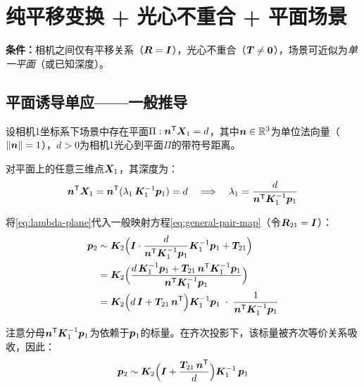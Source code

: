 \section{纯平移变换 + 光心不重合 + 平面场景}
\label{sec:translate-only}

\textbf{条件：}相机之间仅有平移关系（$\bm{R} = \bm{I}$），光心不重合（$\bm{T} \neq \bm{0}$），场景可近似为\emph{单一平面}（或已知深度）。

\subsection{平面诱导单应——一般推导}
\label{sec:plane-induced}

\begin{definition}[平面诱导单应]
设相机1坐标系下场景中存在平面$\Pi: \bm{n}^{\mathsf{T}} \bm{X}_1 = d$，其中$\bm{n} \in \mathbb{R}^3$为单位法向量（$\lVert\bm{n}\rVert=1$），$d > 0$为相机1光心到平面$\Pi$的带符号距离。
\end{definition}

对平面上的任意三维点$\bm{X}_1$，其深度为：
\begin{equation}
\bm{n}^{\mathsf{T}} \bm{X}_1 = \bm{n}^{\mathsf{T}}(\lambda_1\,\bm{K}_1^{-1}\bm{p}_1) = d
\quad\Longrightarrow\quad
\lambda_1 = \frac{d}{\bm{n}^{\mathsf{T}}\bm{K}_1^{-1}\bm{p}_1}
\label{eq:lambda-plane}
\end{equation}

将\eqref{eq:lambda-plane}代入一般映射方程\eqref{eq:general-pair-map}（令$\bm{R}_{21} = \bm{I}$）：
\begin{align}
\bm{p}_2 &\sim \bm{K}_2\Bigl(\bm{I}\cdot \frac{d}{\bm{n}^{\mathsf{T}}\bm{K}_1^{-1}\bm{p}_1}\bm{K}_1^{-1}\bm{p}_1 + \bm{T}_{21}\Bigr) \nonumber \\
           &= \bm{K}_2\Bigl(\frac{d\,\bm{K}_1^{-1}\bm{p}_1 + \bm{T}_{21}\,\bm{n}^{\mathsf{T}}\bm{K}_1^{-1}\bm{p}_1}{\bm{n}^{\mathsf{T}}\bm{K}_1^{-1}\bm{p}_1}\Bigr) \nonumber \\
           &= \bm{K}_2\Bigl(d\,\bm{I} + \bm{T}_{21}\,\bm{n}^{\mathsf{T}}\Bigr)\bm{K}_1^{-1}\bm{p}_1 \;\cdot\; \frac{1}{\bm{n}^{\mathsf{T}}\bm{K}_1^{-1}\bm{p}_1}
\label{eq:plane-deriv}
\end{align}

注意分母$\bm{n}^{\mathsf{T}}\bm{K}_1^{-1}\bm{p}_1$为依赖于$\bm{p}_1$的标量。在齐次投影下，该标量被齐次等价关系吸收，因此：
\begin{equation}
\bm{p}_2 \sim \bm{K}_2\Bigl(\bm{I} + \frac{\bm{T}_{21}\,\bm{n}^{\mathsf{T}}}{d}\Bigr)\bm{K}_1^{-1}\,\bm{p}_1
\label{eq:plane-homography-raw}
\end{equation}

